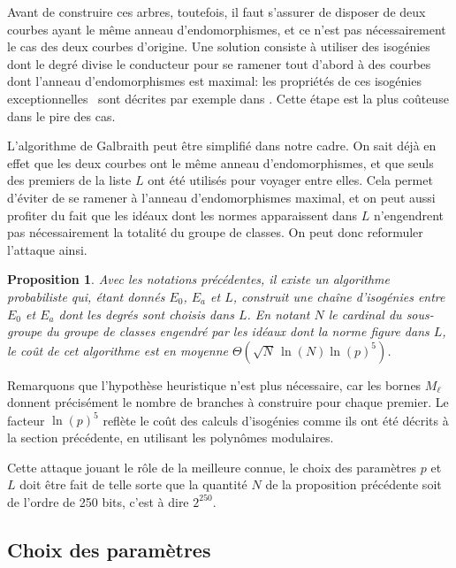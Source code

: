 \documentclass[11pt,a4paper]{article}
\renewcommand{\v}{\vspace{5mm}}
\newtheorem*{prop}{Proposition}
\theoremstyle{definition}
\begin{document}
Avant de construire ces arbres, toutefois, il faut s'assurer de disposer de deux courbes ayant le même anneau d'endomorphismes, et ce n'est pas nécessairement le cas des deux courbes d'origine. Une solution consiste à utiliser des isogénies dont le degré divise le conducteur pour se ramener tout d'abord à des courbes dont l'anneau d'endomorphismes est maximal: les propriétés de ces isogénies \og exceptionnelles \fg\ sont décrites par exemple dans \cite{Kohel}. Cette étape est la plus coûteuse dans le pire des cas.
\v

L'algorithme de Galbraith peut être simplifié dans notre cadre. On sait déjà en effet que les deux courbes ont le même anneau d'endomorphismes, et que seuls des premiers de la liste $L$ ont été utilisés pour voyager entre elles. Cela permet d'éviter de se ramener à l'anneau d'endomorphismes maximal, et on peut aussi profiter du fait que les idéaux dont les normes apparaissent dans $L$ n'engendrent pas nécessairement la totalité du groupe de classes. On peut donc reformuler l'attaque ainsi.

\begin{prop}
Avec les notations précédentes, il existe un algorithme probabiliste qui, étant donnés $E_0$, $E_a$ et $L$, construit une chaîne d'isogénies entre $E_0$ et $E_a$ dont les degrés sont choisis dans $L$. En notant $N$ le cardinal du sous-groupe du groupe de classes engendré par les idéaux dont la norme figure dans $L$, le coût de cet algorithme est en moyenne $\Theta(\sqrt{N}\, \ln(N) \ln(p)^5)$.
\end{prop}

Remarquons que l'hypothèse heuristique n'est plus nécessaire, car les bornes $M_\ell$ donnent précisément le nombre de branches à construire pour chaque premier. Le facteur $\ln(p)^5$ reflète le coût des calculs d'isogénies comme ils ont été décrits à la section précédente, en utilisant les polynômes modulaires.

\v
Cette attaque jouant le rôle de la meilleure connue, le choix des paramètres $p$ et $L$ doit être fait de telle sorte que la quantité $N$ de la proposition précédente soit de l'ordre de 250 bits, c'est à dire $2^{250}$. 



\subsection{Choix des paramètres}
\end{document}
